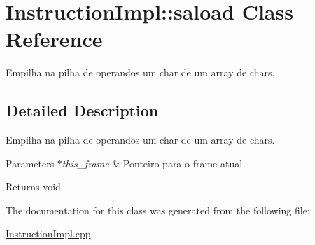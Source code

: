 \hypertarget{class_instruction_impl_1_1saload}{}\section{Instruction\+Impl\+:\+:saload Class Reference}
\label{class_instruction_impl_1_1saload}


Empilha na pilha de operandos um char de um array de chars.  




\subsection{Detailed Description}
Empilha na pilha de operandos um char de um array de chars. 


\begin{DoxyParams}{Parameters}
{\em $\ast$this\+\_\+frame} & Ponteiro para o frame atual \\
\hline
\end{DoxyParams}
\begin{DoxyReturn}{Returns}
void 
\end{DoxyReturn}


The documentation for this class was generated from the following file\+:\begin{DoxyCompactItemize}
\item 
\hyperlink{_instruction_impl_8cpp}{Instruction\+Impl.\+cpp}\end{DoxyCompactItemize}
